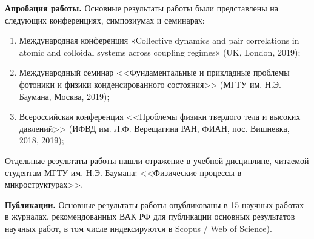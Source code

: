 \textbf{Апробация работы.} Основные результаты работы были представлены на следующих конференциях, симпозиумах и семинарах:
\begin{enumerate}\itemsep0em
\item Международная конференция «Collective dynamics and pair correlations in atomic and colloidal systems across coupling regimes» (UK, London, 2019);
\item Международный семинар <<Фундаментальные и прикладные проблемы фотоники и физики конденсированного состояния>> (МГТУ им. Н.Э. Баумана, Москва, 2019);
\item Всероссийская конференция <<Проблемы физики твердого тела и высоких давлений>> (ИФВД им. Л.Ф. Верещагина РАН, ФИАН, пос. Вишневка, 2018, 2019);

\end{enumerate}

Отдельные результаты работы нашли отражение в учебной дисциплине, читаемой студентам МГТУ им. Н.Э. Баумана: <<Физические процессы в микроструктурах>>.



\textbf{Публикации.} %
Основные результаты работы опубликованы в 15 научных работах в журналах, рекомендованных ВАК РФ для публикации основных результатов научных работ, в том числе индексируются в Scopus / Web of Science).


